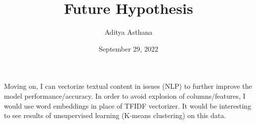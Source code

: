 \documentclass[12pt, letterpaper]{article}
\title{Future Hypothesis}
\author{Aditya Asthana}
\date{September 29, 2022}
\begin{document}
Moving on, I can vectorize textual content in issues (NLP) to further improve the model performance/accuracy.
In order to avoid explosion of columns/features, I would use word embeddings in place of TFIDF vectorizer.
It would be interesting to see results of unsupervised learning (K-means clustering) on this data.
\end{document}
